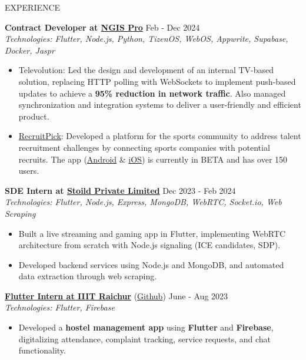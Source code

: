 \documentclass{resume} %
\begin{document}
\begin{rSection}{EXPERIENCE}

   \textbf{Contract Developer at \href{https://ngispro.com}{NGIS Pro}} \hfill Feb - Dec 2024\\
   \textit{Technologies: Flutter, Node.js, Python, TizenOS, WebOS, Appwrite, Supabase, Docker, Jaspr}
   \begin{itemize}
      \itemsep -3pt {}
      \item Televolution: Led the design and development of an internal TV-based solution, replacing HTTP polling with
            WebSockets to implement push-based updates to achieve a \textbf{95\% reduction in network traffic}. Also managed
            synchronization and integration systems to deliver a user-friendly and efficient product.
      \item \href{https://recruitpick.com}{RecruitPick}: Developed a platform for the sports community to address talent recruitment challenges by connecting sports companies with potential recruits. The app (\href{https://play.google.com/store/apps/details?id=com.recruitpick.app.prod}{Android} \& \href{https://apps.apple.com/in/app/recruit-pick-inc/id6478814537}{iOS}) is currently in BETA and has over 150 users.
   \end{itemize}

   \textbf{SDE Intern at \href{https://stoild.in/}{Stoild Private Limited}} \hfill Dec 2023 - Feb 2024\\
   \textit{Technologies: Flutter, Node.js, Express, MongoDB, WebRTC, Socket.io, Web Scraping}
   \begin{itemize}
      \itemsep -3pt {}
      \item Built a live streaming and gaming app in Flutter, implementing WebRTC architecture from scratch with Node.js signaling (ICE candidates, SDP).
      \item Developed backend services using Node.js and MongoDB, and automated data extraction through web scraping.
   \end{itemize}

   \textbf{\href{https://drive.google.com/file/d/16NqRxg5LFhZu0WkdqG3z83XnLyf5P2UO/view?usp=sharing}{Flutter Intern at IIIT Raichur}} (\href{https://github.com/ShivanshuKGupta/hustle_stay}{Github}) \hfill June - Aug 2023\\
   \textit{Technologies: Flutter, Firebase}
   \begin{itemize}
      \itemsep -3pt {}
      \item Developed a \textbf{hostel management app} using \textbf{Flutter} and \textbf{Firebase}, digitalizing attendance, complaint tracking, service requests, and chat functionality.
   \end{itemize}
\end{rSection}
\end{document}
